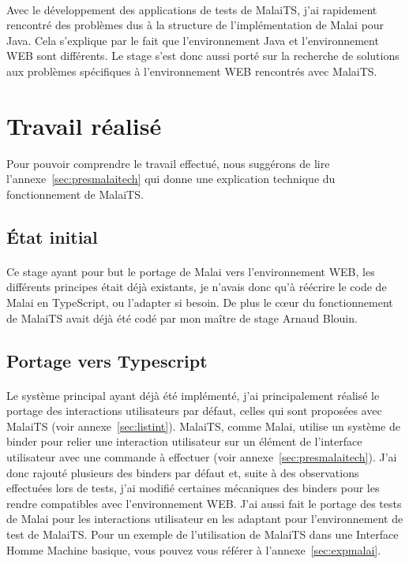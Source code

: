 \documentclass[11pt, a4paper, pdftex]{article}
\begin{document}
            \paragraph{}
                Avec le développement des applications de tests de MalaiTS, j'ai rapidement rencontré des problèmes dus à la structure de l'implémentation de Malai pour Java.
                Cela s'explique par le fait que l'environnement Java et l'environnement WEB sont différents.
                Le stage s'est donc aussi porté sur la recherche de solutions aux problèmes spécifiques à l'environnement WEB rencontrés avec MalaiTS\@.
    \newpage
    \section{Travail réalisé}\label{sec:trarea}
        Pour pouvoir comprendre le travail effectué, nous suggérons de lire l'annexe~\ref{sec:presmalaitech} qui donne une explication technique du fonctionnement de MalaiTS\@.

        \subsection{État initial}\label{subsec:travinit}
            \paragraph{}
                Ce stage ayant pour but le portage de Malai vers l'environnement WEB, les différents principes était déjà existants, je n'avais donc qu'à réécrire le code de Malai en TypeScript, ou l'adapter si besoin.
                De plus le c\oe ur du fonctionnement de MalaiTS avait déjà été codé par mon maître de stage Arnaud Blouin.

        \subsection{Portage vers Typescript}\label{subsec:mainjob}
            \paragraph{}
                Le système principal ayant déjà été implémenté, j'ai principalement réalisé le portage des interactions utilisateurs par défaut, celles qui sont proposées avec MalaiTS (voir annexe~\ref{sec:listint}).
                MalaiTS, comme Malai, utilise un système de binder pour relier une interaction utilisateur sur un élément de l'interface utilisateur avec une commande à effectuer (voir annexe~\ref{sec:presmalaitech}).
                J'ai donc rajouté plusieurs des binders par défaut et, suite à des observations effectuées lors de tests, j'ai modifié certaines mécaniques
                des binders pour les rendre compatibles avec l'environnement WEB\@.
                J'ai aussi fait le portage des tests de Malai pour les interactions utilisateur en les adaptant pour l'environnement de test de MalaiTS\@.
                Pour un exemple de l'utilisation de MalaiTS dans une Interface Homme Machine basique, vous pouvez vous référer à l'annexe~\ref{sec:expmalai}.
\end{document}
